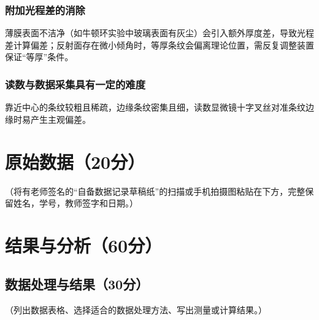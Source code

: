 \documentclass[]{../template/Report}%
\begin{document}
\subsubsection{附加光程差的消除}
薄膜表面不洁净（如牛顿环实验中玻璃表面有灰尘）会引入额外厚度差，导致光程差计算偏差；反射面存在微小倾角时，等厚条纹会偏离理论位置，需反复调整装置保证“等厚”条件。

\subsubsection{读数与数据采集具有一定的难度}
靠近中心的条纹较粗且稀疏，边缘条纹密集且细，读数显微镜十字叉丝对准条纹边缘时易产生主观偏差。

\begin{fullreportonly}
\section{原始数据（20分）}
（将有老师签名的“自备数据记录草稿纸”的扫描或手机拍摄图粘贴在下方，完整保留姓名，学号，教师签字和日期。）

\section{结果与分析（60分）}
\subsection{数据处理与结果（30分）}
（列出数据表格、选择适合的数据处理方法、写出测量或计算结果。）

\end{fullreportonly}
\end{document}
